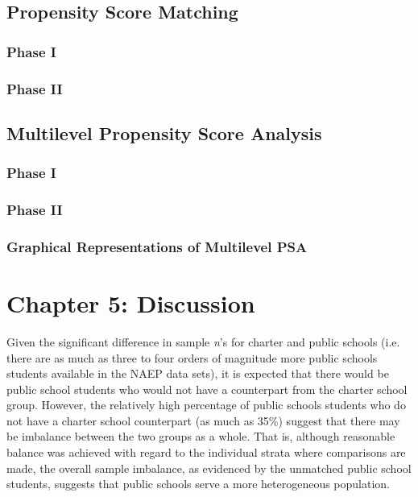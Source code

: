 \documentclass[letterpaper,12p,twoside]{article} %
\begin{document}



\clearpage
\subsection{Propensity Score Matching}

\subsubsection{Phase I}

\subsubsection{Phase II}




\clearpage
\subsection{Multilevel Propensity Score Analysis}

\subsubsection{Phase I}

\subsubsection{Phase II}



\subsubsection{Graphical Representations of Multilevel PSA}


\cleardoublepage
\section{Chapter 5: Discussion}


Given the significant difference in sample \textit{n}'s for charter and public schools (i.e. there are as much as three to four orders of magnitude more public schools students available in the NAEP data sets), it is expected that there would be public school students who would not have a counterpart from the charter school group. However, the relatively high percentage of public schools students who do not have a charter school counterpart (as much as 35\%) suggest that there may be imbalance between the two groups as a whole. That is, although reasonable balance was achieved with regard to the individual strata where comparisons are made, the overall sample imbalance, as evidenced by the unmatched public school students, suggests that public schools serve a more heterogeneous population.
\end{document}
